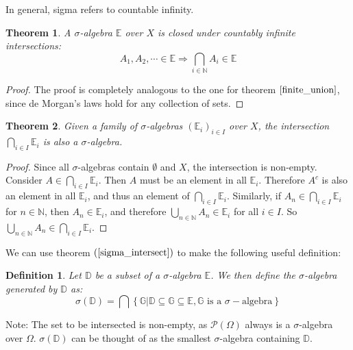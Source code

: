 \documentclass[12pt, a4paper]{article}
\newtheorem{theorem}{Theorem}[section]
\newtheorem{definition}{Definition}[section]
\numberwithin{equation}{section}
\begin{document}
In general, sigma refers to countable infinity.

\begin{theorem}
A $\sigma$-algebra $\mathbb{E}$ over $X$ is closed under countably infinite intersections:
\begin{equation}
A_1, A_2,\cdots\in\mathbb{E}\Rightarrow\underset{i\in\mathbb{N}}{\bigcap}A_i\in\mathbb{E}
\end{equation}
\end{theorem}
\begin{proof}
The proof is completely analogous to the one for theorem $\ref{finite_union}$, since de Morgan's laws hold for any collection of sets.
\end{proof}

\begin{theorem}
\label{sigma_intersect}
Given a family of $\sigma$-algebras $(\mathbb{E}_i)_{i\in I}$ over $X$, the intersection $\bigcap_{i\in I}\mathbb{E}_i$ is also a $\sigma$-algebra.
\end{theorem}
\begin{proof}
Since all $\sigma$-algebras contain $\emptyset$ and $X$, the intersection is non-empty. Consider $A\in\bigcap_{i\in I}\mathbb{E}_i$. Then $A$ must be an element in all $\mathbb{E}_i$. Therefore $A^c$ is also an element in all $\mathbb{E}_i$, and thus an element of $\bigcap_{i\in I}\mathbb{E}_i$. Similarly, if $A_n\in\bigcap_{i\in I}\mathbb{E}_i$ for $n\in\mathbb{N}$, then $A_n\in\mathbb{E}_i$, and therefore $\bigcup_{n\in\mathbb{N}}A_n\in\mathbb{E}_i$ for all $i\in I$. So $\bigcup_{n\in\mathbb{N}}A_n\in\bigcap_{i\in I}\mathbb{E}_i$.
\end{proof}

We can use theorem $(\ref{sigma_intersect})$ to make the following useful definition:

\begin{definition}
Let $\mathbb{D}$ be a subset of a $\sigma$-algebra $\mathbb{E}$. We then define the $\sigma$-algebra generated by $\mathbb{D}$ as:
\begin{equation}
\sigma(\mathbb{D})=\bigcap\left\{\mathbb{G}|\mathbb{D}\subseteq\mathbb{G}\subseteq\mathbb{E}, \mathbb{G}\textrm{ is a }\sigma-\textrm{algebra}\right\}
\end{equation}
\end{definition}

Note: The set to be intersected is non-empty, as $\mathcal{P}(\Omega)$ always is a $\sigma$-algebra over $\Omega$. $\sigma(\mathbb{D})$ can be thought of as the smallest $\sigma$-algebra containing $\mathbb{D}$.
\end{document}
